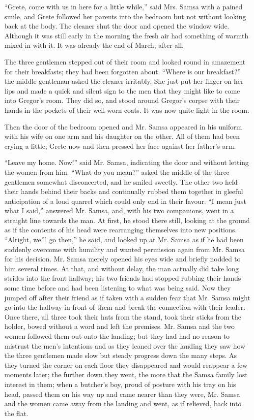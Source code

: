 \documentclass[12pt]{report}
\begin{document}
``Grete, come with us in here for a little while,'' said Mrs. Samsa with
a pained smile, and Grete followed her parents into the bedroom but not
without looking back at the body. The cleaner shut the door and opened
the window wide. Although it was still early in the morning the fresh
air had something of warmth mixed in with it. It was already the end of
March, after all.

The three gentlemen stepped out of their room and looked round in
amazement for their breakfasts; they had been forgotten about. ``Where
is our breakfast?'' the middle gentleman asked the cleaner irritably.
She just put her finger on her lips and made a quick and silent sign to
the men that they might like to come into Gregor's room. They did so,
and stood around Gregor's corpse with their hands in the pockets of
their well-worn coats. It was now quite light in the room.

Then the door of the bedroom opened and Mr. Samsa appeared in his
uniform with his wife on one arm and his daughter on the other. All of
them had been crying a little; Grete now and then pressed her face
against her father's arm.

``Leave my home. Now!'' said Mr. Samsa, indicating the door and without
letting the women from him. ``What do you mean?'' asked the middle of
the three gentlemen somewhat disconcerted, and he smiled sweetly. The
other two held their hands behind their backs and continually rubbed
them together in gleeful anticipation of a loud quarrel which could only
end in their favour. ``I mean just what I said,'' answered Mr. Samsa,
and, with his two companions, went in a straight line towards the man.
At first, he stood there still, looking at the ground as if the contents
of his head were rearranging themselves into new positions. ``Alright,
we'll go then,'' he said, and looked up at Mr. Samsa as if he had been
suddenly overcome with humility and wanted permission again from Mr.
Samsa for his decision. Mr. Samsa merely opened his eyes wide and
briefly nodded to him several times. At that, and without delay, the man
actually did take long strides into the front hallway; his two friends
had stopped rubbing their hands some time before and had been listening
to what was being said. Now they jumped off after their friend as if
taken with a sudden fear that Mr. Samsa might go into the hallway in
front of them and break the connection with their leader. Once there,
all three took their hats from the stand, took their sticks from the
holder, bowed without a word and left the premises. Mr. Samsa and the
two women followed them out onto the landing; but they had had no reason
to mistrust the men's intentions and as they leaned over the landing
they saw how the three gentlemen made slow but steady progress down the
many steps. As they turned the corner on each floor they disappeared and
would reappear a few moments later; the further down they went, the more
that the Samsa family lost interest in them; when a butcher's boy, proud
of posture with his tray on his head, passed them on his way up and came
nearer than they were, Mr. Samsa and the women came away from the
landing and went, as if relieved, back into the flat.
\end{document}
